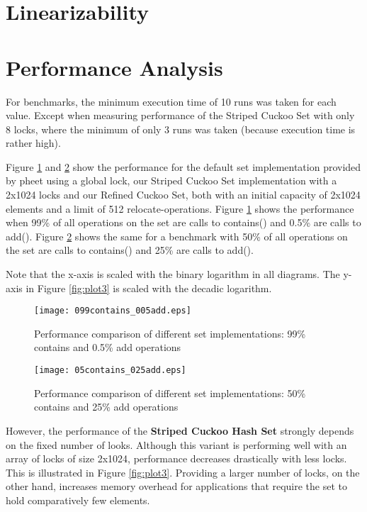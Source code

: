 \documentclass[a4paper,10pt]{article}
\begin{document}
\section{Linearizability}
\label{serc:linearizability}

\section{Performance Analysis}
\label{sec:performance}
For benchmarks, the minimum execution time of 10 runs was taken for each value.
Except when measuring performance of the Striped Cuckoo Set with only 8 locks,
where the minimum of only 3 runs was taken (because execution time is rather
high).

Figure \ref{fig:plot1} and \ref{fig:plot2} show the performance for the default
set implementation provided by pheet using a global lock, our Striped Cuckoo
Set implementation with a 2x1024 locks and our Refined Cuckoo Set, both with an
initial capacity of 2x1024 elements and a limit of 512 relocate-operations.
Figure \ref{fig:plot1} shows the performance when 99\% of all operations on the
set are calls to contains() and 0.5\% are calls to add(). Figure
\ref{fig:plot2} shows the same for a benchmark with 50\% of all operations on
the set are calls to contains() and 25\% are calls to add().

Note that the x-axis is scaled with the binary logarithm in all diagrams. The
y-axis in Figure \ref{fig:plot3} is scaled with the decadic logarithm.

\begin{figure}[H]
\begin{center}
\texttt{[image: 099contains\_005add.eps]}
\end{center}
\caption{Performance comparison of different set implementations: 99\% contains and 0.5\% add operations}
\label{fig:plot1}
\end{figure}

\begin{figure}[H]
\begin{center}
\texttt{[image: 05contains\_025add.eps]}
\end{center}
\caption{Performance comparison of different set implementations: 50\% contains and 25\% add operations}
\label{fig:plot2}
\end{figure}

However, the performance of the \textbf{Striped Cuckoo Hash Set} strongly
depends on the fixed number of looks. Although this variant is performing well
with an array of locks of size 2x1024, performance decreases drastically with
less locks. This is illustrated in Figure \ref{fig:plot3}. Providing a larger
number of locks, on the other hand, increases memory overhead for applications
that require the set to hold comparatively few elements.
\end{document}
